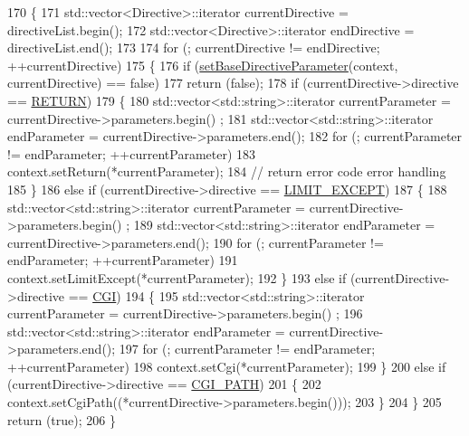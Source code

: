 \begin{DoxyCode}
170     \{
171         std::vector<Directive>::iterator    currentDirective = directiveList.begin();
172         std::vector<Directive>::iterator    endDirective = directiveList.end();
173 
174         \textcolor{keywordflow}{for} (; currentDirective != endDirective; ++currentDirective)
175         \{
176             \textcolor{keywordflow}{if} (\hyperlink{classft_1_1_parser_a9f412d172694519d0d8dd9edacd257c0}{setBaseDirectiveParameter}(context, currentDirective) == \textcolor{keyword}{false})
177                 \textcolor{keywordflow}{return} (\textcolor{keyword}{false});
178             \textcolor{keywordflow}{if} (currentDirective->directive == \hyperlink{namespaceft_a5a5554dff10f0dc50bae4cc5825ad75da520e09ffec033636dba711f3441cc600}{RETURN})
179             \{
180                 std::vector<std::string>::iterator  currentParameter = currentDirective->parameters.begin()
      ;
181                 std::vector<std::string>::iterator      endParameter = currentDirective->parameters.end();
182                 \textcolor{keywordflow}{for} (; currentParameter != endParameter; ++currentParameter)
183                     context.setReturn(*currentParameter);
184                 \textcolor{comment}{// return error code error handling}
185             \}
186             \textcolor{keywordflow}{else} \textcolor{keywordflow}{if} (currentDirective->directive == \hyperlink{namespaceft_a5a5554dff10f0dc50bae4cc5825ad75da25b0e84438d71cc28e97f17a01cfde7a}{LIMIT\_EXCEPT})
187             \{
188                 std::vector<std::string>::iterator  currentParameter = currentDirective->parameters.begin()
      ;
189                 std::vector<std::string>::iterator      endParameter = currentDirective->parameters.end();
190                 \textcolor{keywordflow}{for} (; currentParameter != endParameter; ++currentParameter)
191                     context.setLimitExcept(*currentParameter);
192             \}
193             \textcolor{keywordflow}{else} \textcolor{keywordflow}{if} (currentDirective->directive == \hyperlink{namespaceft_a5a5554dff10f0dc50bae4cc5825ad75da7b2e2f10add9bba874f82f39725423c5}{CGI})
194             \{
195                 std::vector<std::string>::iterator  currentParameter = currentDirective->parameters.begin()
      ;
196                 std::vector<std::string>::iterator      endParameter = currentDirective->parameters.end();
197                 \textcolor{keywordflow}{for} (; currentParameter != endParameter; ++currentParameter)
198                     context.setCgi(*currentParameter);
199             \}
200             \textcolor{keywordflow}{else} \textcolor{keywordflow}{if} (currentDirective->directive == \hyperlink{namespaceft_a5a5554dff10f0dc50bae4cc5825ad75da874adc6c563690bc7a39ac6a0060e38a}{CGI\_PATH})
201             \{
202                 context.setCgiPath((*currentDirective->parameters.begin()));
203             \}
204         \}
205         \textcolor{keywordflow}{return} (\textcolor{keyword}{true});
206     \}
\end{DoxyCode}
